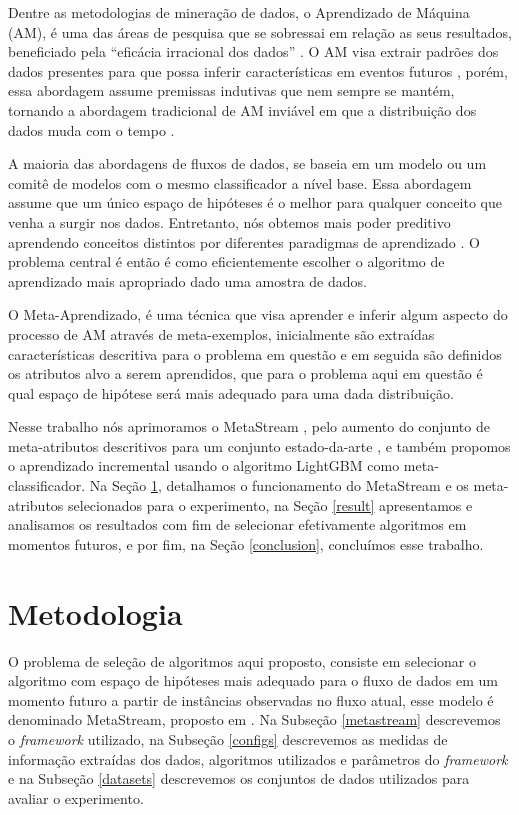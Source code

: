 \documentclass[conference,compsoc]{IEEEtran}
\begin{document}
Dentre as metodologias de mineração de dados, o Aprendizado de Máquina (AM), é uma das áreas de pesquisa que se sobressai em relação as seus resultados, beneficiado pela ``eficácia irracional dos dados'' \cite{halevy2009unreasonable}. O AM visa extrair padrões dos dados presentes para que possa inferir características em eventos futuros \cite{mitchell1997machine}, porém, essa abordagem assume premissas indutivas que nem sempre se mantém, tornando a abordagem tradicional de AM inviável em que a distribuição dos dados muda com o tempo \cite{gama2007learning}.

A maioria das abordagens de fluxos de dados, se baseia em um modelo ou um comitê de modelos com o mesmo classificador a nível base. Essa abordagem assume que um único espaço de hipóteses é o melhor para qualquer conceito que venha a surgir nos dados. Entretanto, nós obtemos mais poder preditivo aprendendo conceitos distintos por diferentes paradigmas de aprendizado \cite{rossi2014metastream}. O problema central é então é como eficientemente escolher o algoritmo de aprendizado mais apropriado dado uma amostra de dados.

O Meta-Aprendizado, é uma técnica que visa aprender e inferir algum aspecto do processo de AM através de meta-exemplos, inicialmente são extraídas características descritiva para o problema em questão e em seguida são definidos os atributos alvo a serem aprendidos, que para o problema aqui em questão é qual espaço de hipótese será mais adequado para uma dada distribuição.

Nesse trabalho nós aprimoramos o MetaStream \cite{rossi2014metastream}, pelo aumento do conjunto de meta-atributos descritivos para um conjunto estado-da-arte \cite{rivolli2018towards}, e também propomos o aprendizado incremental usando o algoritmo LightGBM \cite{ke2017lightgbm} como meta-classificador. Na Seção \ref{method}, detalhamos o funcionamento do MetaStream e os meta-atributos selecionados para o experimento, na Seção \ref{result} apresentamos e analisamos os resultados com fim de selecionar efetivamente algoritmos em momentos futuros, e por fim, na Seção \ref{conclusion}, concluímos esse trabalho.


\section{Metodologia}
\label{method}
O problema de seleção de algoritmos aqui proposto, consiste em selecionar o algoritmo com espaço de hipóteses mais adequado para o fluxo de dados em um momento futuro a partir de instâncias observadas no fluxo atual, esse modelo é denominado MetaStream, proposto em \cite{rossi2014metastream}. Na Subseção \ref{metastream} descrevemos o \textit{framework} utilizado, na Subseção \ref{configs} descrevemos as medidas de informação extraídas dos dados, algoritmos utilizados e parâmetros do \textit{framework} e na Subseção \ref{datasets} descrevemos os conjuntos de dados utilizados para avaliar o experimento.
\end{document}
